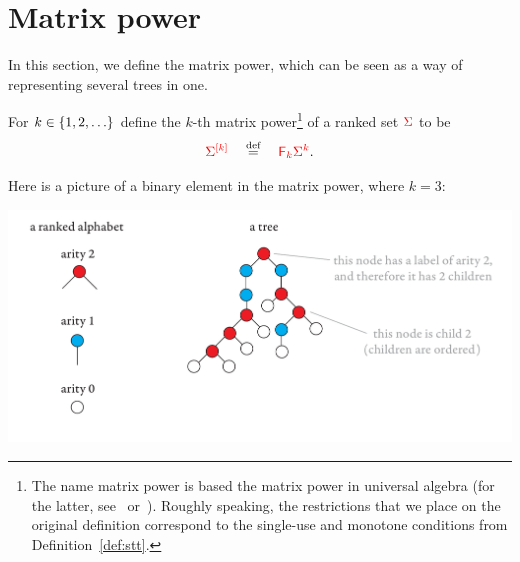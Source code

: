 
\section{Matrix power} 
\label{sec:matrix-power}
In this section, we define the matrix power, which can be seen as a way of representing several trees in one. %

\begin{definition}
     For $k \in \{1,2,\ldots\}$ define the $k$-th matrix power\footnote{
        The name  matrix power is based the matrix power in  universal algebra (for the latter, see~\cite{Taylor1975} or~\cite{szendrei1990simple}). Roughly speaking, the restrictions that we place on the original definition correspond to the single-use and monotone conditions from Definition~\ref{def:stt}. 
     } of a ranked set ${\color{red}{\Sigma}}$ 
to be 
\begin{align*}
 {\color{red}{\Sigma}}^{{\color{red}{[k]}}} \quad \stackrel{\text{def}}= \quad {\color{red}{{\color{red}{\mathsf F_{k}}}{\color{red}{\Sigma}}^k}}.
\end{align*}
\end{definition}

Here is a picture of a binary element in the matrix power, where $k=3$:
\begin{center}
\includegraphics[scale=.4, page=85]{pics.pdf}
\end{center}

